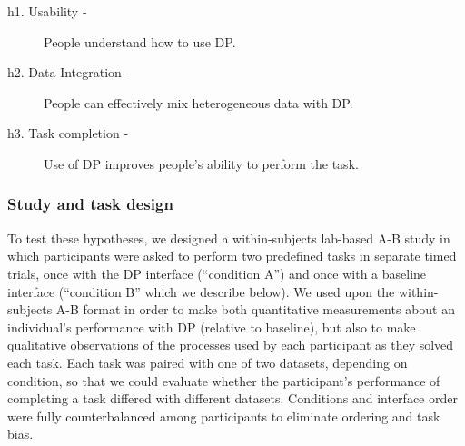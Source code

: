 \documentclass{sigchi}
\begin{document}


\begin{description}
\item [h1. Usability -] People understand how to use DP.
\item [h2. Data Integration -] People can effectively mix heterogeneous data with DP.
\item [h3. Task completion -] Use of DP improves people's ability to perform the task.
\end{description}

\subsubsection{Study and task design}
To test these hypotheses, we designed a within-subjects lab-based A-B study in which participants were asked to perform two predefined tasks in separate timed trials, once with the DP interface (``condition A'') and once with a baseline interface (``condition B'' which we describe below).  We used upon the within-subjects A-B format in order to make both quantitative measurements about an individual's performance with DP (relative to baseline), but also to make qualitative observations of the processes used by each participant as they solved each task.  Each task was paired with one of two datasets, depending on condition, so that we could evaluate whether the participant's performance of completing a task differed with different datasets.  Conditions and interface order were fully counterbalanced among participants to eliminate ordering and task bias.  
\end{document}
